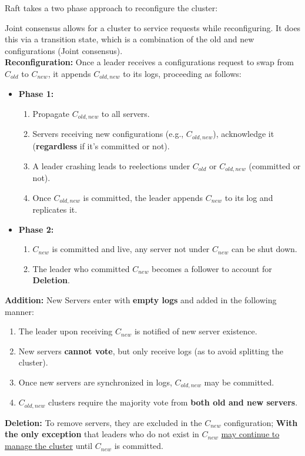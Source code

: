 \noindent
Raft takes a two phase approach to reconfigure the cluster:
\begin{Def}

    Joint consensus allows for a cluster to service requests while reconfiguring.
    It does this via a transition state, which is a combination of the old and new configurations (Joint consensus).\\

    \noindent
    \textbf{Reconfiguration:} Once a leader receives a configurations request to swap from $C_{old}$ to $C_{new}$, it appends $C_{old,new}$ to its logs, proceeding
    as follows:
    \begin{itemize}
        \item \textbf{Phase 1:}
        \begin{enumerate}
            \item Propagate $C_{old,new}$ to all servers.
            \item Servers receiving new configurations (e.g., $C_{old,new}$), acknowledge it (\textbf{regardless} if it's committed or not).
            \item A leader crashing leads to reelections under $C_{old}$ or $C_{old,new}$ (committed or not).
            \item Once $C_{old,new}$ is committed, the leader appends $C_{new}$ to its log and replicates it.
        \end{enumerate}
        \item \textbf{Phase 2:} 
        \begin{enumerate}
            \item $C_{new}$ is committed and live, any server not under $C_{new}$ can be shut down.
            \item The leader who committed $C_{new}$ becomes a follower to account for \textbf{Deletion}.
        \end{enumerate}
        
        
    \end{itemize}

    \noindent
    \textbf{Addition:} New Servers enter with \textbf{empty logs} and added in the following manner:
    \begin{enumerate}
        \item The leader upon receiving $C_{new}$ is notified of new server existence.
        \item New servers \textbf{cannot vote}, but only receive logs (as to avoid splitting the cluster).
        \item Once new servers are synchronized in logs, $C_{old,new}$ may be committed.
        \item $C_{old,new}$ clusters require the majority vote from \textbf{both old and new servers}.
    \end{enumerate}

    \noindent
    \textbf{Deletion:} To remove servers, they are excluded in the $C_{new}$ configuration; \textbf{With the only exception} that leaders who do not exist in $C_{new}$
    \underline{may continue to manage the cluster} until $C_{new}$ is committed.
    
\end{Def}
